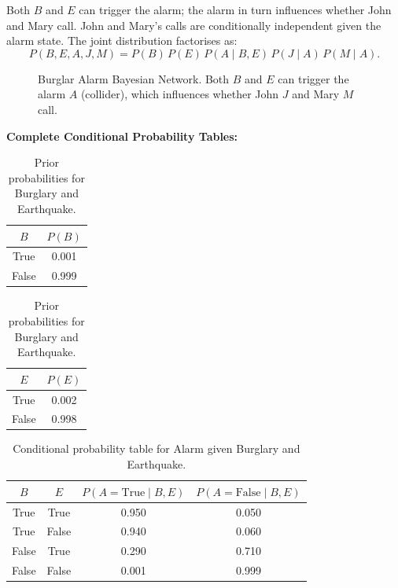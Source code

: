 Both $B$ and $E$ can trigger the alarm; the alarm in turn influences whether
John and Mary call. John and Mary's calls are conditionally independent given
the alarm state. The joint distribution factorises as:
\[
P(B,E,A,J,M) = P(B)\,P(E)\,P(A\mid B,E)\,P(J\mid A)\,P(M\mid A).
\]

\begin{figure}[htbp]
\centering
{}
\caption{Burglar Alarm Bayesian Network. Both $B$ and $E$ can trigger the
         alarm $A$ (collider), which influences whether John $J$ and Mary
         $M$ call.}
\label{fig:burglar_alarm_bn}
\end{figure}

\textbf{Complete Conditional Probability Tables:}

\begin{table}[H]
\centering
\begin{tabular}{cc}
\hline
$B$ & $P(B)$ \\\hline
True  & 0.001 \\
False & 0.999 \\\hline
\end{tabular}
\quad
\begin{tabular}{cc}
\hline
$E$ & $P(E)$ \\\hline
True  & 0.002 \\
False & 0.998 \\\hline
\end{tabular}
\caption{Prior probabilities for Burglary and Earthquake.}
\end{table}

\begin{table}[H]
\centering
\begin{tabular}{cccc}
\hline
$B$ & $E$ & $P(A=\text{True}\mid B,E)$ & $P(A=\text{False}\mid B,E)$ \\\hline
True  & True  & 0.950 & 0.050 \\
True  & False & 0.940 & 0.060 \\
False & True  & 0.290 & 0.710 \\
False & False & 0.001 & 0.999 \\\hline
\end{tabular}
\caption{Conditional probability table for Alarm given Burglary and Earthquake.}
\end{table}

